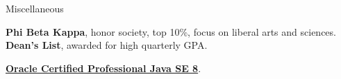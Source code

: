 \begin{rubric}{Miscellaneous}

\entry*[2018] \textbf{Phi Beta Kappa}, honor society, top 10\%, focus on liberal arts and sciences.
\entry*[2016-2018] \textbf{Dean's List}, awarded for high quarterly GPA. %

\entry*[2018] \textbf{\href{https://www.youracclaim.com/badges/c3d44a4e-fabc-4abb-b4fd-2079a364f6bd/public_url}{Oracle Certified Professional Java SE 8}}.

\end{rubric}